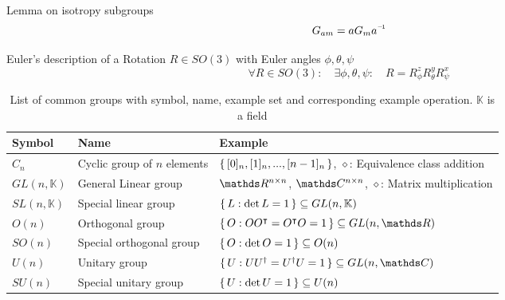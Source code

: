 		\noindent
		Lemma on isotropy subgroups
		\begin{equation}
			G_{a m} = a G_{m} \inv{a}
		\end{equation}

		\noindent
		Euler's description of a Rotation $R\in SO(3)$ with Euler angles $\phi, \theta, \psi$
		\begin{equation}
			\forall R \in SO(3):\quad \exists \phi, \theta, \psi:\quad R = R_\phi^z R_\theta^y R_\psi^x
		\end{equation}

		\begin{table}[ht]
			\begin{center}
				\begin{tabular}{ l | l | l }
					Symbol & Name & Example \\ \hline
					$C_n$ & Cyclic group of $n$ elements & $\set{[0]_n, [1]_n, ..., [n-1]_n}$, $\diamond$: Equivalence class addition \\
					$GL(n, \mathbb{K})$ & General Linear group & $\reals ^{n\times n}$, $\complex ^{n\times n}$, $\diamond$: Matrix multiplication \\
					$SL(n, \mathbb{K})$ & Special linear group & $\set{L: \det L = 1} \subseteq GL(n, \mathbb{K})$ \\
					$O(n)$ & Orthogonal group & $\set{O: O O^\trp = O^\trp O = 1}\subseteq GL(n, \reals )$ \\
					$SO(n)$ & Special orthogonal group& $\set{O: \det O = 1}\subseteq O(n)$\\
					$U(n)$ & Unitary group & $\set{U: UU^{\dagger}=U^{\dagger}U=1}\subseteq GL(n, \complex )$ \\
					$SU(n)$ & Special unitary group & $\set{U: \det U = 1}\subseteq U(n)$ \\
				\end{tabular}
				\caption{List of common groups with symbol, name, example set and corresponding example operation. $\mathbb{K}$ is a field}
			\end{center}
		\end{table} \vsp




